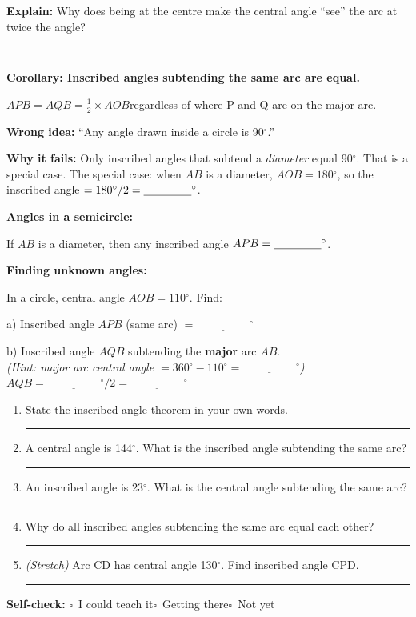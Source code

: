 \documentclass[11pt, a4paper]{article}
\newcommand{\blank}[1]{\underline{\hspace{#1}}}
\newcommand{\dgr}{\ensuremath{^\circ}}
\newcommand{\answerline}{\par\vspace{0.45cm}\noindent\rule{\linewidth}{0.4pt}\par\vspace{0.1cm}}
\newcommand{\selfcheck}{\par\smallskip\noindent\textbf{Self-check:}
  $\square$~I could teach it\quad$\square$~Getting there\quad$\square$~Not yet\smallskip}
\begin{document}
\textbf{Explain:} Why does being at the centre make the central angle ``see'' the arc at twice the angle?
\answerline\answerline

\textbf{Corollary: Inscribed angles subtending the same arc are equal.}

$APB = AQB = \tfrac{1}{2} \times AOB$\quad regardless of where P and Q are on the major arc.

\begin{tcolorbox}[misconc]
\textbf{Wrong idea:} ``Any angle drawn inside a circle is 90\dgr{}.''

\smallskip
\textbf{Why it fails:} Only inscribed angles that subtend a \textit{diameter} equal 90\dgr{}. That is a special case. The special case: when $AB$ is a diameter, $AOB = 180\dgr{}$, so the inscribed angle $= 180\dgr{}/2 = \blank{1.5cm}\dgr{}$.
\end{tcolorbox}

\textbf{Angles in a semicircle:}

If $AB$ is a diameter, then any inscribed angle $APB = \blank{1.5cm}\dgr{}$.

\vspace{6pt}
\textbf{Finding unknown angles:}

In a circle, central angle $AOB = 110\dgr{}$. Find:

a) Inscribed angle $APB$ (same arc) $= \blank{2cm}\dgr{}$

b) Inscribed angle $AQB$ subtending the \textbf{major} arc $AB$.\\
\quad\textit{(Hint: major arc central angle $= 360\dgr{} - 110\dgr{} = \blank{2cm}\dgr{}$)}\quad
$AQB = \blank{2cm}\dgr{}/2 = \blank{2cm}\dgr{}$

\begin{tcolorbox}[retrieval]
\begin{enumerate}[leftmargin=*, itemsep=10pt]
  \item State the inscribed angle theorem in your own words. \answerline
  \item A central angle is 144\dgr{}. What is the inscribed angle subtending the same arc? \answerline
  \item An inscribed angle is 23\dgr{}. What is the central angle subtending the same arc? \answerline
  \item Why do all inscribed angles subtending the same arc equal each other? \answerline
  \item \textit{(Stretch)} Arc CD has central angle 130\dgr{}. Find inscribed angle CPD. \answerline
\end{enumerate}
\selfcheck
\end{tcolorbox}
\end{document}
